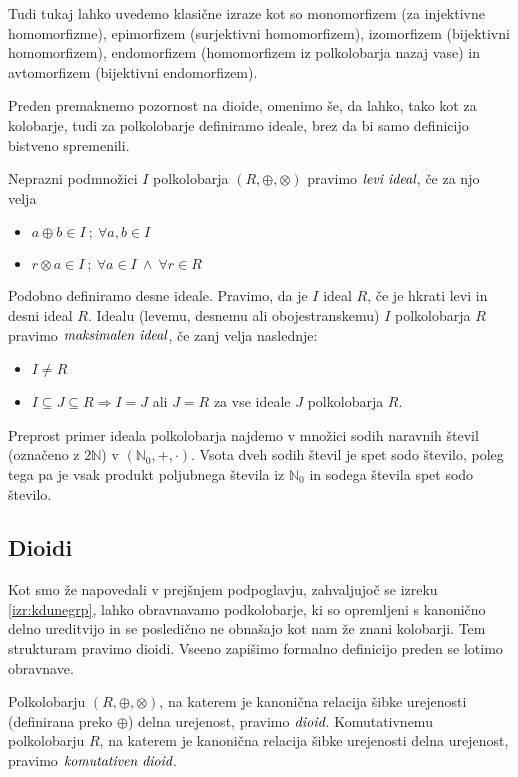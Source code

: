 \documentclass[mat1]{fmfdelo}
\newcommand{\N}{\mathbb{N}}
\newcommand{\No}{\N_0}
\newcommand{\pojem}[1]{\ensuremath{\emph{#1}}}
\begin{document}
Tudi tukaj lahko uvedemo klasične izraze kot so monomorfizem (za injektivne homomorfizme), epimorfizem (surjektivni homomorfizem), izomorfizem (bijektivni homomorfizem), endomorfizem (homomorfizem iz polkolobarja nazaj vase) in avtomorfizem (bijektivni endomorfizem).

Preden premaknemo pozornost na dioide, omenimo še, da lahko, tako kot za kolobarje, tudi za polkolobarje definiramo ideale, brez da bi samo definicijo bistveno spremenili.

\begin{definicija}
	Neprazni podmnožici $I$ polkolobarja $(R, \oplus, \otimes)$ pravimo \pojem{levi ideal}, če za njo velja \begin{itemize}
		\item $a \oplus b \in I~;~\forall a, b\in I$
		\item $r\otimes a \in I~;~\forall a\in I~\land~\forall r\in R$ 
	\end{itemize}
	Podobno definiramo desne ideale. Pravimo, da je $I$ ideal $R$, če je hkrati levi in desni ideal $R$.
	Idealu (levemu, desnemu ali obojestranskemu) $I$ polkolobarja $R$ pravimo \pojem{maksimalen ideal}, če zanj velja naslednje: \begin{itemize}
		\item $I \neq R$
		\item $I \subseteq J \subseteq R \Rightarrow I = J$ ali $J = R$ za vse ideale $J$ polkolobarja $R$.
	\end{itemize}
\end{definicija}
Preprost primer ideala polkolobarja najdemo v množici sodih naravnih števil (označeno z $2\N$) v $(\No, +, \cdot)$. Vsota dveh sodih števil je spet sodo število, poleg tega pa je vsak produkt poljubnega števila iz $\No$ in sodega števila spet sodo število.
\subsection{Dioidi}
Kot smo že napovedali v prejšnjem podpoglavju, zahvaljujoč se izreku \ref{izr:kdunegrp}, lahko obravnavamo podkolobarje, ki so opremljeni s kanonično delno ureditvijo in se posledično ne obnašajo kot nam že znani kolobarji. Tem strukturam pravimo dioidi. Vseeno zapišimo formalno definicijo preden se lotimo obravnave.
\begin{definicija}
	Polkolobarju $(R, \oplus, \otimes)$, na katerem je kanonična relacija šibke urejenosti (definirana preko $\oplus$) delna urejenost, pravimo \pojem{dioid}. Komutativnemu polkolobarju $R$, na katerem je kanonična relacija šibke urejenosti delna urejenost, pravimo \pojem{komutativen dioid}.
\end{definicija}
	
\end{document}
